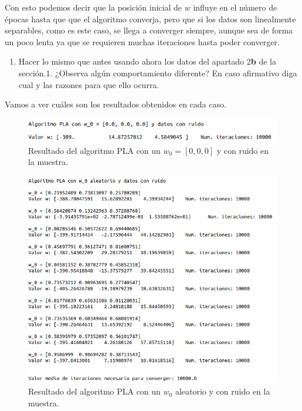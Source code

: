 \documentclass[11pt,a4paper]{article}
\begin{document}
Con esto podemos decir que la posición inicial de $w$ influye en el número de épocas hasta que
que el algoritmo converja, pero que si los datos son linealmente separables, como es este caso,
se llega a converger siempre, aunque sea de forma un poco lenta ya que se requieren muchas iteraciones
hasta poder converger.

\begin{enumerate}[resume,label=\textit{\alph*})]
	\item Hacer lo mismo que antes usando ahora los datos del apartado 2\textbf{b} de la sección.1.
	¿Observa algún comportamiento diferente? En caso afirmativo diga cual y las razones para que ello
	ocurra.
\end{enumerate}

Vamos a ver cuáles son los resultados obtenidos en cada caso.

\begin{figure}[H]
\centering
\includegraphics[scale=0.6]{img/pla_0_noise.png}
\caption{Resultado del algoritmo PLA con un $w_0 = [0, 0, 0]$ y con ruido en la muestra.}
\end{figure}

\begin{figure}[H]
\centering
\includegraphics[scale=0.52]{img/pla_rand_noise.png}
\caption{Resultado del algoritmo PLA con un $w_0$ aleatorio y con ruido en la muestra.}
\end{figure}
\end{document}
